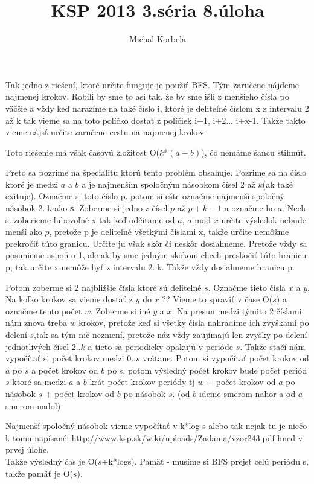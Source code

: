 \documentclass[a4paper,11pt]{article}
\title{KSP 2013 3.séria 8.úloha}
\author{Michal Korbela}
\begin{document}
Tak jedno z riešení, ktoré určite funguje je použiť BFS. Tým zaručene nájdeme najmenej krokov. Robili by sme to asi tak, že by sme išli z menšieho čísla po väčšie a vždy keď narazíme na také číslo i, ktoré je deliteľné číslom x z intervalu 2 až k tak vieme sa na toto políčko dostať z políčiek i+1, i+2... i+x-1. Takže takto vieme nájsť určite zaručene cestu na najmenej krokov.

Toto riešenie má však časovú zložitosť O($ k $*$ (a-b) $), čo nemáme šancu stihnúť.

Preto sa pozrime na špecialitu ktorú tento problém obsahuje. Pozrime sa na číslo ktoré je medzi $a$ a $b$ a je najmenším spoločným násobkom čísel 2 až $ k $(ak také exituje). Označme si toto číslo p. potom si ešte označme najmenší spoločný násobok 2..k ako \textbf{s}. Zoberme si jedno z čísel $ p $ až $ p+k-1 $ a označme ho $a$. Nech si zoberieme ľubovoľné x tak keď odčítame od $a$, $a$ mod $x$ určite výsledok nebude menší ako $p$, pretože p je deliteľné všetkými číslami x, takže určite nemôžme prekročiť túto granicu. Určite ju však skôr či neskôr dosiahneme. Pretože vždy sa posunieme aspoň o 1, ale ak by sme jedným skokom chceli preskočiť túto hranicu p, tak určite x nemôže byť z intervalu 2..k. Takže vždy dosiahneme hranicu p.

Potom zoberme si 2 najbližšie čísla ktoré sú deliteľné $ s $. Označme tieto čísla $ x $ a $ y $. Na koľko krokov sa vieme dostať z $ y $ do $ x $ ??
Vieme to spraviť v čase O($ s $) a označme tento počet $ w $. Zoberme si iné $ y $ a $ x $. Na presun medzi týmito 2 číslami nám znova treba $ w $ krokov, pretože keď si všetky čísla nahradíme ich zvyškami po delení $ s $,tak sa tým nič nezmení, pretože náz vždy zaujímajú len zvyšky po delení jednotlivých čísel 2..$ k $ a tieto sa periodicky opakujú v perióde $ s $. Takže stačí nám vypočítať si počet krokov medzi 0..$ s $  vrátane. Potom si vypočítať počet krokov od $ a $ po $ s $ a počet krokov od $ b $ po s. potom výsledný počet krokov bude počet periód $ s $ ktoré sa medzi $ a $ a $ b $ krát počet krokov periódy tj $ w $ + počet krokov od $ a $ po násobok $ s $ + počet krokov od $ b $ po násobok $ s $. (od $ b $ ideme smerom nahor a od $ a $ smerom nadol)

Najmenší spoločný násobok vieme vypočítať v k*log s alebo tak nejak tu je niečo k tomu napísané:
http://www.ksp.sk/wiki/uploads/Zadania/vzor243.pdf
hned v prvej úlohe.
\\

Takže výsledný čas je O($ s $+k*logs). Pamäť - musíme si BFS prejsť celú periódu s, takže pamäť je O($ s $).
\end{document}
